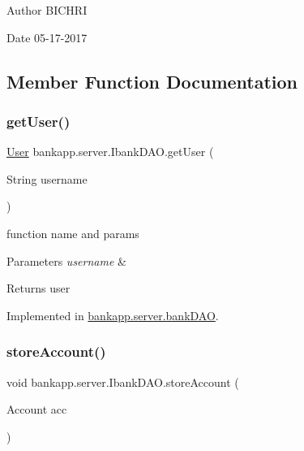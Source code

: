 \begin{DoxyAuthor}{Author}
B\+I\+C\+H\+RI 
\end{DoxyAuthor}
\begin{DoxyDate}{Date}
05-\/17-\/2017 
\end{DoxyDate}


\subsection{Member Function Documentation}
\mbox{\label{interfacebankapp_1_1server_1_1IbankDAO_a11bbbf14695bce77b2932f36fdb79bd8}} 
\subsubsection{\texorpdfstring{get\+User()}{getUser()}}
{\footnotesize\ttfamily \hyperlink{classbankapp_1_1server_1_1User}{User} bankapp.\+server.\+Ibank\+D\+A\+O.\+get\+User (\begin{DoxyParamCaption}\item[{String}]{username }\end{DoxyParamCaption})}



function name and params 


\begin{DoxyParams}{Parameters}
{\em username} & \\
\hline
\end{DoxyParams}
\begin{DoxyReturn}{Returns}
user 
\end{DoxyReturn}


Implemented in \hyperlink{classbankapp_1_1server_1_1bankDAO_af952db62263ca6ebda3130336e63f941}{bankapp.\+server.\+bank\+D\+AO}.

\mbox{\label{interfacebankapp_1_1server_1_1IbankDAO_a6631fb11c78a48b05a743e4f7f2757ef}} 
\subsubsection{\texorpdfstring{store\+Account()}{storeAccount()}}
{\footnotesize\ttfamily void bankapp.\+server.\+Ibank\+D\+A\+O.\+store\+Account (\begin{DoxyParamCaption}\item[{Account}]{acc }\end{DoxyParamCaption})}



